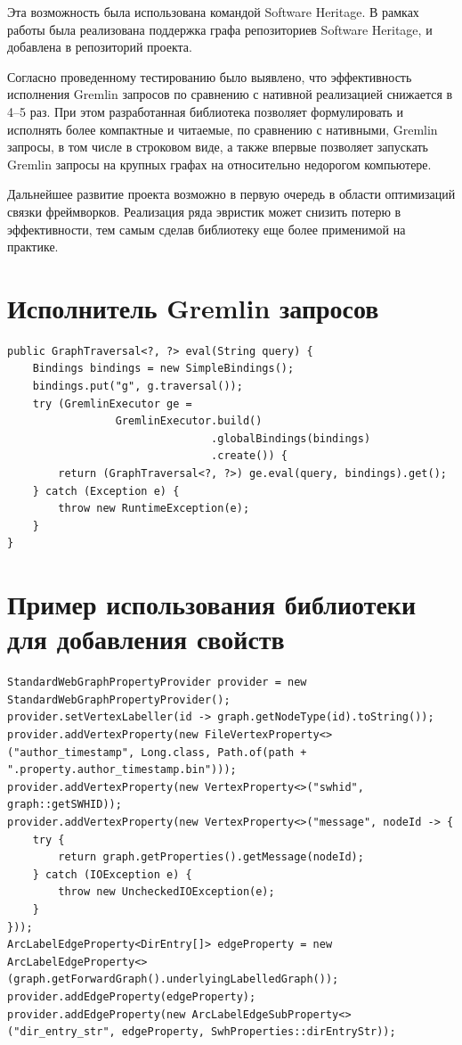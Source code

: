 \documentclass[times,specification,annotation]{itmo-student-thesis}
\begin{document}
Эта возможность была использована командой Software Heritage. В рамках работы была реализована поддержка графа репозиториев Software Heritage, и добавлена в репозиторий проекта.

Согласно проведенному тестированию было выявлено, что эффективность исполнения Gremlin запросов по сравнению с нативной реализацией снижается в 4--5 раз. При этом разработанная библиотека позволяет формулировать и исполнять более компактные и читаемые, по сравнению с нативными, Gremlin запросы, в том числе в строковом виде, а также впервые позволяет запускать Gremlin запросы на крупных графах на относительно недорогом компьютере.

Дальнейшее развитие проекта возможно в первую очередь в области оптимизаций связки фреймворков. Реализация ряда эвристик может снизить потерю в эффективности, тем самым сделав библиотеку еще более применимой на практике.

\printmainbibliography

\appendix

\chapter{Исполнитель Gremlin запросов}\label{sec:app:eval}
\begin{lstlisting}[float=!h,caption={Реализация метода, исполняющего строковые Gremlin запросы},label={lst:gremlin-eval}]
public GraphTraversal<?, ?> eval(String query) {
    Bindings bindings = new SimpleBindings();
    bindings.put("g", g.traversal());
    try (GremlinExecutor ge =
                 GremlinExecutor.build()
                                .globalBindings(bindings)
                                .create()) {
        return (GraphTraversal<?, ?>) ge.eval(query, bindings).get();
    } catch (Exception e) {
        throw new RuntimeException(e);
    }
}
\end{lstlisting}

\chapter{Пример использования библиотеки для добавления свойств}\label{sec:app:swh-props}
\begin{lstlisting}[float=!h,caption={Добавление свойств для графа Software Heritage},label={lst:props}]
StandardWebGraphPropertyProvider provider = new StandardWebGraphPropertyProvider();
provider.setVertexLabeller(id -> graph.getNodeType(id).toString());
provider.addVertexProperty(new FileVertexProperty<>("author_timestamp", Long.class, Path.of(path + ".property.author_timestamp.bin")));
provider.addVertexProperty(new VertexProperty<>("swhid", graph::getSWHID));
provider.addVertexProperty(new VertexProperty<>("message", nodeId -> {
    try {
        return graph.getProperties().getMessage(nodeId);
    } catch (IOException e) {
        throw new UncheckedIOException(e);
    }
}));
ArcLabelEdgeProperty<DirEntry[]> edgeProperty = new ArcLabelEdgeProperty<>(graph.getForwardGraph().underlyingLabelledGraph());
provider.addEdgeProperty(edgeProperty);
provider.addEdgeProperty(new ArcLabelEdgeSubProperty<>("dir_entry_str", edgeProperty, SwhProperties::dirEntryStr));
\end{lstlisting}
\end{document}
